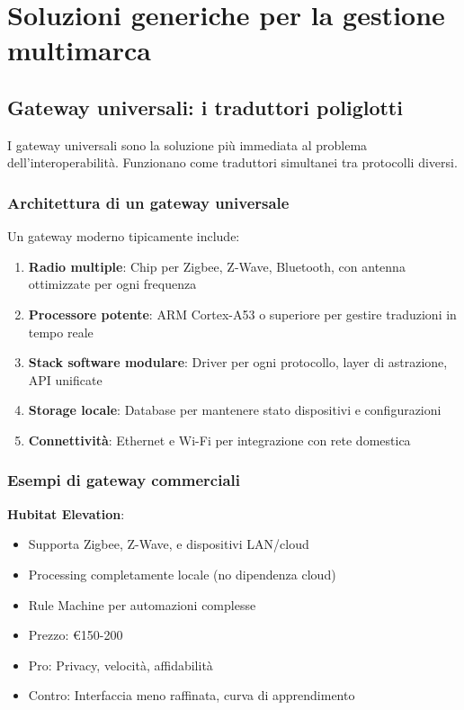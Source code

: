 \section{Soluzioni generiche per la gestione multimarca}

\subsection{Gateway universali: i traduttori poliglotti}

I gateway universali sono la soluzione più immediata al problema dell'interoperabilità. Funzionano come traduttori simultanei tra protocolli diversi.

\subsubsection{Architettura di un gateway universale}

Un gateway moderno tipicamente include:

\begin{enumerate}
    \item \textbf{Radio multiple}: Chip per Zigbee, Z-Wave, Bluetooth, con antenna ottimizzate per ogni frequenza
    \item \textbf{Processore potente}: ARM Cortex-A53 o superiore per gestire traduzioni in tempo reale
    \item \textbf{Stack software modulare}: Driver per ogni protocollo, layer di astrazione, API unificate
    \item \textbf{Storage locale}: Database per mantenere stato dispositivi e configurazioni
    \item \textbf{Connettività}: Ethernet e Wi-Fi per integrazione con rete domestica
\end{enumerate}

\subsubsection{Esempi di gateway commerciali}

\textbf{Hubitat Elevation}:
\begin{itemize}
    \item Supporta Zigbee, Z-Wave, e dispositivi LAN/cloud
    \item Processing completamente locale (no dipendenza cloud)
    \item Rule Machine per automazioni complesse
    \item Prezzo: €150-200
    \item Pro: Privacy, velocità, affidabilità
    \item Contro: Interfaccia meno raffinata, curva di apprendimento
\end{itemize}

